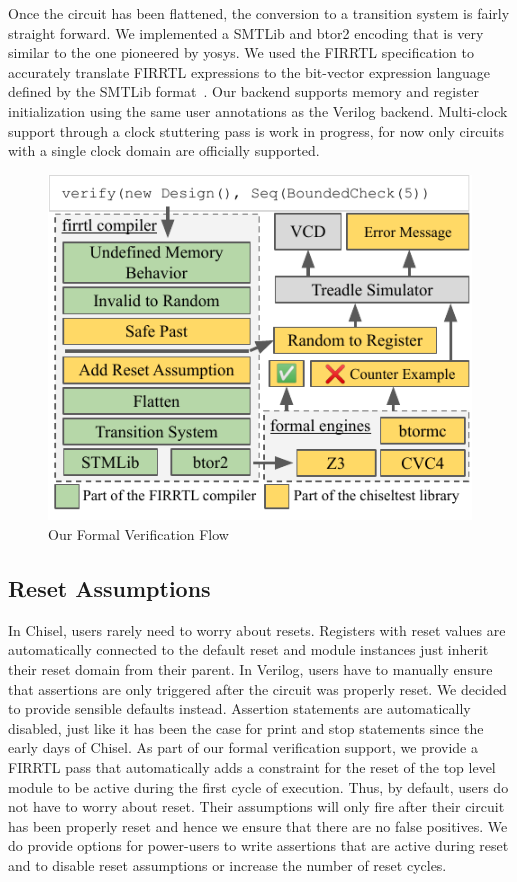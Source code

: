 \documentclass[conference]{IEEEtran}
\begin{document}
Once the circuit has been flattened, the conversion to a transition system is fairly straight forward.
We implemented a SMTLib and btor2 encoding that is very similar to the one pioneered by yosys.
We used the FIRRTL specification to accurately translate FIRRTL expressions to the bit-vector expression language defined by the SMTLib format~\cite{smtlib}.
Our backend supports memory and register initialization using the same user annotations as the Verilog backend.
Multi-clock support through a clock stuttering pass is work in progress, for now only circuits with a single clock domain are officially supported.



\begin{figure}
\centering
\includegraphics{woset_verify_flow.pdf}
\caption{Our Formal Verification Flow}
\label{fig:verify-flow}
\end{figure}

\subsection{Reset Assumptions}\label{sec:reset}

In Chisel, users rarely need to worry about resets.
Registers with reset values are automatically connected to the default reset %
and module instances just inherit their reset domain from their parent.
In Verilog, users have to manually ensure that assertions are only triggered after the circuit was properly reset.
We decided to provide sensible defaults instead.
Assertion statements are automatically disabled, just like it has been the case for print and stop statements
since the early days of Chisel.
As part of our formal verification support, we provide a FIRRTL pass
that automatically adds a constraint for the reset of the top level module to be active during the first cycle of execution.
Thus, by default, users do not have to worry about reset. Their assumptions will only fire
after their circuit has been properly reset and hence we ensure that there are no false positives.
We do provide options for power-users to write assertions that are active during reset and to
disable reset assumptions or increase the number of reset cycles.
\end{document}
